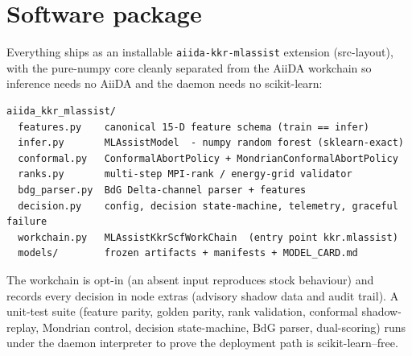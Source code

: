 \documentclass[11pt]{article}
\newcommand{\code}[1]{\texttt{#1}}
\begin{document}
\section{Software package}
\label{sec:package}
Everything ships as an installable \code{aiida-kkr-mlassist} extension (src-layout), with the pure-numpy
core cleanly separated from the AiiDA workchain so inference needs no AiiDA and the daemon needs no
scikit-learn:
\begin{lstlisting}
aiida_kkr_mlassist/
  features.py    canonical 15-D feature schema (train == infer)
  infer.py       MLAssistModel  - numpy random forest (sklearn-exact)
  conformal.py   ConformalAbortPolicy + MondrianConformalAbortPolicy
  ranks.py       multi-step MPI-rank / energy-grid validator
  bdg_parser.py  BdG Delta-channel parser + features
  decision.py    config, decision state-machine, telemetry, graceful failure
  workchain.py   MLAssistKkrScfWorkChain  (entry point kkr.mlassist)
  models/        frozen artifacts + manifests + MODEL_CARD.md
\end{lstlisting}
The workchain is opt-in (an absent input reproduces stock behaviour) and records every decision in node
extras (advisory shadow data and audit trail). A unit-test suite (feature parity, golden parity, rank
validation, conformal shadow-replay, Mondrian control, decision state-machine, BdG parser, dual-scoring)
runs under the daemon interpreter to prove the deployment path is scikit-learn--free.
\end{document}
